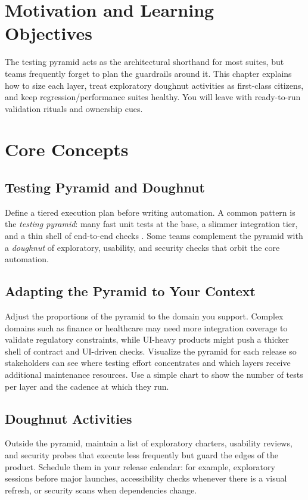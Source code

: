 \section{Motivation and Learning Objectives}

The testing pyramid acts as the architectural shorthand for most suites, but teams frequently forget to plan the guardrails around it. This chapter explains how to size each layer, treat exploratory doughnut activities as first-class citizens, and keep regression/performance suites healthy. You will leave with ready-to-run validation rituals and ownership cues.

\section{Core Concepts}

\subsection{Testing Pyramid and Doughnut}

Define a tiered execution plan before writing automation. A common pattern is the \emph{testing pyramid}: many fast unit tests at the base, a slimmer integration tier, and a thin shell of end-to-end checks \citep{kaner2002testing}. Some teams complement the pyramid with a \emph{doughnut} of exploratory, usability, and security checks that orbit the core automation.

\subsection{Adapting the Pyramid to Your Context}

Adjust the proportions of the pyramid to the domain you support. Complex domains such as finance or healthcare may need more integration coverage to validate regulatory constraints, while UI-heavy products might push a thicker shell of contract and UI-driven checks. Visualize the pyramid for each release so stakeholders can see where testing effort concentrates and which layers receive additional maintenance resources. Use a simple chart to show the number of tests per layer and the cadence at which they run.

\subsection{Doughnut Activities}

Outside the pyramid, maintain a list of exploratory charters, usability reviews, and security probes that execute less frequently but guard the edges of the product. Schedule them in your release calendar: for example, exploratory sessions before major launches, accessibility checks whenever there is a visual refresh, or security scans when dependencies change.

